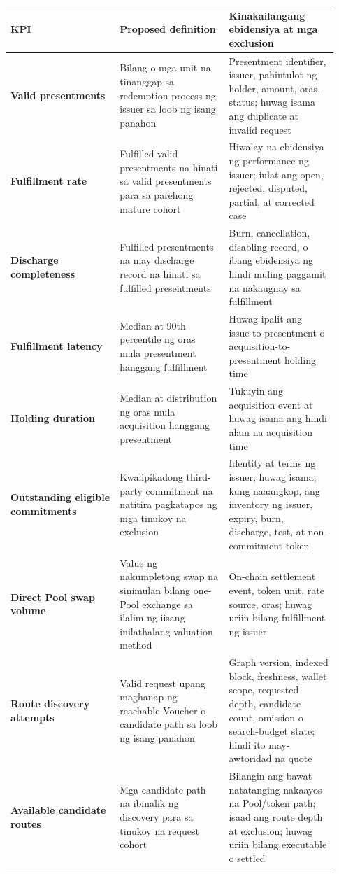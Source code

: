 \documentclass[11pt]{article}
\begin{document}
\begin{longtable}{P{0.31\linewidth} P{0.31\linewidth} P{0.31\linewidth}}
\toprule
KPI & Proposed definition & Kinakailangang ebidensiya at mga exclusion \\
\midrule
\endhead
\textbf{Valid presentments} & Bilang o mga unit na tinanggap sa redemption process ng issuer sa loob ng isang panahon & Presentment identifier, issuer, pahintulot ng holder, amount, oras, status; huwag isama ang duplicate at invalid request \\
\textbf{Fulfillment rate} & Fulfilled valid presentments na hinati sa valid presentments para sa parehong mature cohort & Hiwalay na ebidensiya ng performance ng issuer; iulat ang open, rejected, disputed, partial, at corrected case \\
\textbf{Discharge completeness} & Fulfilled presentments na may discharge record na hinati sa fulfilled presentments & Burn, cancellation, disabling record, o ibang ebidensiya ng hindi muling paggamit na nakaugnay sa fulfillment \\
\textbf{Fulfillment latency} & Median at 90th percentile ng oras mula presentment hanggang fulfillment & Huwag ipalit ang issue-to-presentment o acquisition-to-presentment holding time \\
\textbf{Holding duration} & Median at distribution ng oras mula acquisition hanggang presentment & Tukuyin ang acquisition event at huwag isama ang hindi alam na acquisition time \\
\textbf{Outstanding eligible commitments} & Kwalipikadong third-party commitment na natitira pagkatapos ng mga tinukoy na exclusion & Identity at terms ng issuer; huwag isama, kung naaangkop, ang inventory ng issuer, expiry, burn, discharge, test, at non-commitment token \\
\textbf{Direct Pool swap volume} & Value ng nakumpletong swap na sinimulan bilang one-Pool exchange sa ilalim ng iisang inilathalang valuation method & On-chain settlement event, token unit, rate source, oras; huwag uriin bilang fulfillment ng issuer \\
\textbf{Route discovery attempts} & Valid request upang maghanap ng reachable Voucher o candidate path sa loob ng isang panahon & Graph version, indexed block, freshness, wallet scope, requested depth, candidate count, omission o search-budget state; hindi ito may-awtoridad na quote \\
\textbf{Available candidate routes} & Mga candidate path na ibinalik ng discovery para sa tinukoy na request cohort & Bilangin ang bawat natatanging nakaayos na Pool/token path; isaad ang route depth at exclusion; huwag uriin bilang executable o settled \\

\end{longtable}
\end{document}
